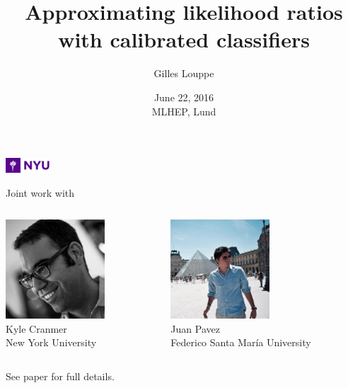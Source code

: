 \documentclass{beamer}
\title{{\bf Approximating likelihood ratios with calibrated classifiers}}
\author{
Gilles Louppe
}
\date{June 22, 2016\\
MLHEP, Lund}
\let\oldcitep=\citep
\renewcommand\citep[1]{\hyperlink{#1}{\oldcitep{#1}}}
\begin{document}
\begin{frame}[plain]
\titlepage
\centering
\includegraphics[height=1.5em]{figures/nyu.jpg}
\end{frame}

\begin{frame}
    \centering
    Joint work with
    \vspace{2em}

    \begin{columns}
      \begin{column}[t]{0.45\textwidth}
        \centering
        \includegraphics[height=10em]{figures/kyle.jpg}\\
        Kyle Cranmer\\
        {\scriptsize New York University}
      \end{column}
      \begin{column}[t]{0.45\textwidth}
          \centering
          \includegraphics[height=10em]{figures/juan.jpg}\\
          Juan Pavez\\
          {\scriptsize Federico Santa Mar\'ia University}
      \end{column}
    \end{columns}

    \vspace{2em}

    See paper \citep{cranmer2015approximating} for full details.
\end{frame}
\end{document}
